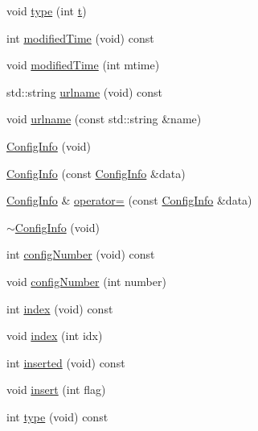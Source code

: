 \begin{DoxyCompactItemize}
void \mbox{\hyperlink{classFILEDB_1_1ConfigInfo_a8d65b3b00e90f7daa4ab65fae36ed024}{type}} (int \mbox{\hyperlink{hadron__timeslice_8cc_ac310d9181e916ba43604099aee272c71}{t}})
\item 
int \mbox{\hyperlink{classFILEDB_1_1ConfigInfo_a03212f15d26edbae21ea53bbce2b1793}{modified\+Time}} (void) const
\item 
void \mbox{\hyperlink{classFILEDB_1_1ConfigInfo_a5c250fc2d94faafa05f18d8126ccf0cb}{modified\+Time}} (int mtime)
\item 
std\+::string \mbox{\hyperlink{classFILEDB_1_1ConfigInfo_a2ed44f5e85fa1b69bb30fcad8cf71fa3}{urlname}} (void) const
\item 
void \mbox{\hyperlink{classFILEDB_1_1ConfigInfo_a49750ae80347780d48415cb7aac9a068}{urlname}} (const std\+::string \&name)
\item 
\mbox{\hyperlink{classFILEDB_1_1ConfigInfo_a5aa818d39aeb907f27e064cab48c3522}{Config\+Info}} (void)
\item 
\mbox{\hyperlink{classFILEDB_1_1ConfigInfo_aa36d3fc640cd713ac561f89483c1b5f9}{Config\+Info}} (const \mbox{\hyperlink{classFILEDB_1_1ConfigInfo}{Config\+Info}} \&data)
\item 
\mbox{\hyperlink{classFILEDB_1_1ConfigInfo}{Config\+Info}} \& \mbox{\hyperlink{classFILEDB_1_1ConfigInfo_addda23bfc94267dee10eb00355316514}{operator=}} (const \mbox{\hyperlink{classFILEDB_1_1ConfigInfo}{Config\+Info}} \&data)
\item 
\mbox{\hyperlink{classFILEDB_1_1ConfigInfo_a26e3e1b90a453aac1419e42e7b13ce05}{$\sim$\+Config\+Info}} (void)
\item 
int \mbox{\hyperlink{classFILEDB_1_1ConfigInfo_ae4526dad4c6de972b1eb25ee8cd11c67}{config\+Number}} (void) const
\item 
void \mbox{\hyperlink{classFILEDB_1_1ConfigInfo_a226c79a0ee78d03894cfb6b7ed207992}{config\+Number}} (int number)
\item 
int \mbox{\hyperlink{classFILEDB_1_1ConfigInfo_a1ea886d3469211d480bf2c26d474c365}{index}} (void) const
\item 
void \mbox{\hyperlink{classFILEDB_1_1ConfigInfo_a150cd1f4438ac651aef387d251506dc7}{index}} (int idx)
\item 
int \mbox{\hyperlink{classFILEDB_1_1ConfigInfo_a45cc2aa85de0ccd89c06989bb9cff843}{inserted}} (void) const
\item 
void \mbox{\hyperlink{classFILEDB_1_1ConfigInfo_a59ae164a1b55687a88e37d876c4f05f6}{insert}} (int flag)
\item 
int \mbox{\hyperlink{classFILEDB_1_1ConfigInfo_a8053fc6dd889fb1e7c888359412fc0c7}{type}} (void) const

\end{DoxyCompactItemize}

